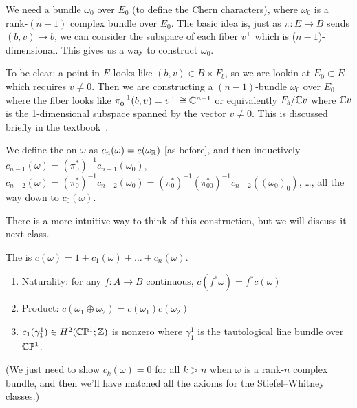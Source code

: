 \begin{construction}\label{node:fall2026:lec20:math157a:construction-omega-0}
We need a bundle $\omega_{0}$ over $E_{0}$ (to define the Chern
characters), where $\omega_{0}$ is a rank-$(n-1)$ complex bundle over $E_{0}$.
The basic idea is, just as $\pi\colon E\to B$ sends $(b,v)\mapsto b$,
we can consider the subspace of each fiber $v^{\perp}$ which is
($n-1$)-dimensional. This gives us a way to construct $\omega_{0}$.


To be clear: a point in $E$ looks like $(b,v)\in B\times F_{b}$, so we
are lookin at $E_{0}\subset E$ which requires $v\neq0$. Then we are
constructing a $(n-1)$-bundle $\omega_{0}$ over $E_{0}$ where the
fiber looks like $\pi_{0}^{-1}(b,v)=v^{\perp}\cong\mathbb{C}^{n-1}$ or
equivalently $F_{b}/\mathbb{C} v$ where $\mathbb{C} v$ is the 1-dimensional subspace
spanned by the vector $v\neq0$. This is discussed briefly in the textbook~\cite[\S14.2]{milnor1974characteristic}.
\end{construction}

\begin{definition}
We define the  on $\omega$ as
$c_{n}(\omega)=e(\omega_{\mathbb{R}})$ [as before], and then inductively
$c_{n-1}(\omega)=(\pi_{0}^{*})^{-1}c_{n-1}(\omega_{0})$, $c_{n-2}(\omega)=(\pi_{0}^{*})^{-1}c_{n-2}(\omega_{0})=(\pi_{0}^{*})^{-1}(\pi_{00}^{*})^{-1}c_{n-2}((\omega_{0})_{0})$,
\dots, all the way down to $c_{0}(\omega)$.
\end{definition}

\begin{node}
There is a more intuitive way to think of this construction, but we
will discuss it next class.
\end{node}


\begin{definition}
The  is $c(\omega)=1+c_{1}(\omega)+\dots+c_{n}(\omega)$.
\end{definition}
\begin{proposition}
\begin{enumerate}
\item Naturality: for any $f\colon A\to B$ continuous, $c(f^{*}\omega)=f^{*}c(\omega)$
\item Product: $c(\omega_{1}\oplus\omega_{2})=c(\omega_{1})c(\omega_{2})$
\item $c_{1}(\gamma^{1}_{1})\in H^{2}(\mathbb{C}\mathbb{P}^{1};\mathbb{Z})$ is nonzero where
  $\gamma^{1}_{1}$ is the tautological line bundle over $\mathbb{C}\mathbb{P}^{1}$.
\end{enumerate}
\end{proposition}

(We just need to show $c_{k}(\omega)=0$ for all $k>n$ when $\omega$ is
a rank-$n$ complex bundle, and then we'll have matched all the axioms
for the Stiefel--Whitney classes.)